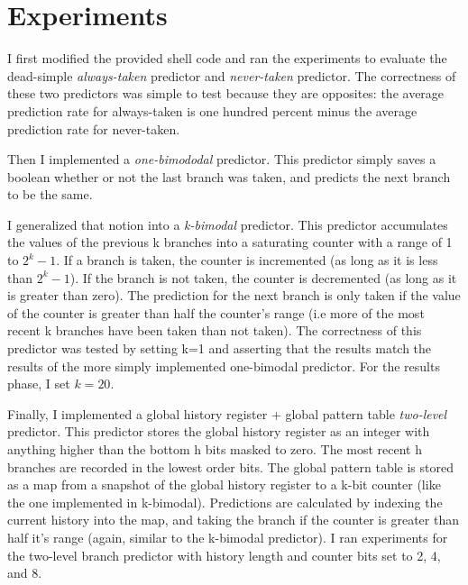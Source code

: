 \documentclass[9pt]{article}
\begin{document}
\maketitle



\section{Experiments}


I first modified the provided shell code and ran the experiments to evaluate the dead-simple \textit{always-taken} predictor and \textit{never-taken} predictor. The correctness of these two predictors was simple to test because they are opposites: the average prediction rate for always-taken is one hundred percent minus the average prediction rate for never-taken. 

Then I implemented a \textit{one-bimododal} predictor. This predictor simply saves a boolean whether or not the last branch was taken, and predicts the next branch to be the same.

I generalized that notion into a \textit{k-bimodal} predictor. This predictor accumulates the values of the previous k branches into a saturating counter with a range of 1 to $2^k - 1$. If a branch is taken, the counter is incremented (as long as it is less than $2^k - 1$). If the branch is not taken, the counter is decremented (as long as it is greater than zero). The prediction for the next branch is only taken if the value of the counter is greater than half the counter's range (i.e more of the most recent k branches have been taken than not taken). The correctness of this predictor was tested by setting k=1 and asserting that the results match the results of the more simply implemented one-bimodal predictor. For the results phase, I set $k = 20$.

Finally, I implemented a global history register + global pattern table \textit{two-level} predictor. This predictor stores the global history register as an integer with anything higher than the bottom h bits masked to zero. The most recent h branches are recorded in the lowest order bits. The global pattern table is stored as a map from a snapshot of the global history register to a k-bit counter (like the one implemented in k-bimodal). Predictions are calculated by indexing the current history into the map, and taking the branch if the counter is greater than half it's range (again, similar to the k-bimodal predictor). I ran experiments for the two-level branch predictor with history length and counter bits set to 2, 4, and 8. 
\end{document}
